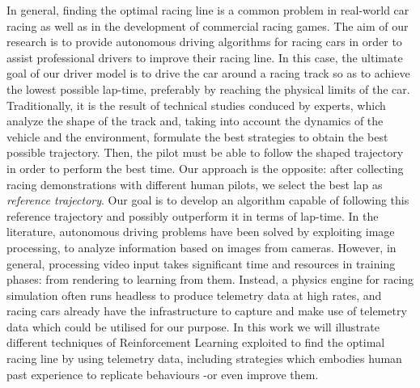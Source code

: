 In general, finding the optimal racing line is a common problem in real-world car racing as well as in the development of commercial racing games.
The aim of our research is to provide autonomous driving algorithms for racing cars in order to assist professional drivers to improve their racing line.
In this case, the ultimate goal of our driver model is to drive the car around a racing track so as to achieve the lowest possible lap-time, preferably by reaching the physical limits of the car.
Traditionally, it is the result of technical studies conduced by experts, which analyze the shape of the track and, taking into account the dynamics of the vehicle and the environment, formulate the best strategies to obtain the best possible trajectory. Then, the pilot must be able to follow the shaped trajectory in order to perform the best time.
Our approach is the opposite: after collecting racing demonstrations with different human pilots, we select the best lap as \textit{reference trajectory}. Our goal is to develop an algorithm capable of following this reference trajectory and possibly outperform it in terms of lap-time.
In the literature, autonomous driving problems have been solved by exploiting image processing, to analyze information based on images from cameras. However, in general, processing video input takes significant time and resources in training phases: from rendering to learning from them. Instead, a physics engine for racing simulation often runs headless to produce telemetry data at high rates, and racing cars already have the infrastructure to capture and make use of telemetry data which could be utilised for our purpose.
In this work we will illustrate different techniques of Reinforcement Learning exploited to find the optimal racing line by using telemetry data, including strategies which embodies human past experience to replicate behaviours -or even improve them. 



